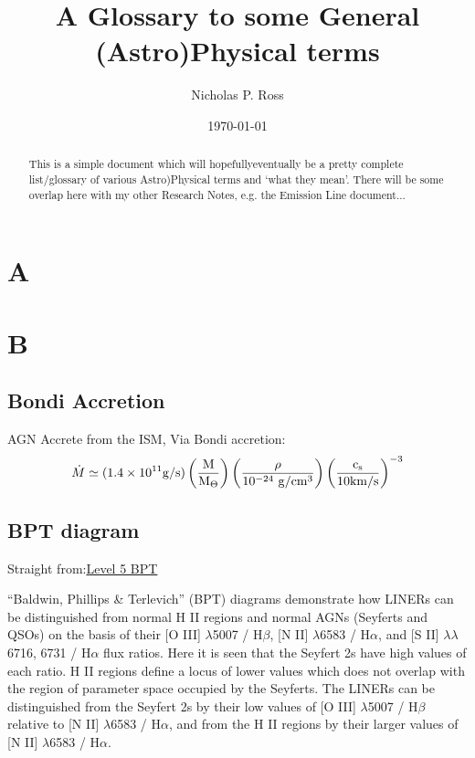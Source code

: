 \documentclass[11pt]{article}
\begin{document}
\title{A Glossary to some General (Astro)Physical terms}
\author{Nicholas P. Ross}
\date{\today}
\maketitle


\begin{abstract}
This is a simple document which will hopefully\/eventually be a pretty complete
list/glossary of various Astro)Physical terms and `what they mean'. There will 
be some overlap here with my other Research Notes, e.g. the Emission Line
document...
\end{abstract}

\section{A}
\section{B}
    \subsection{Bondi Accretion}
    AGN Accrete from the ISM, Via Bondi accretion:
    \begin{equation}
      \dot{M} \simeq (1.4\times10^{11} \rm{g/s}) \left( \frac{M}{M_{\Theta}} \right) \left( \frac{\rho}{10^{-24}\ \rm{g / cm^{3}}} \right)  \left( \frac{c_s}{10 \rm{km/s}} \right)^{-3}
    \end{equation}
    
    
    \subsection{BPT diagram}
    Straight from:\href{http://ned.ipac.caltech.edu/level5/Glossary/Essay_bpt.html}{Level 5 BPT}
    
    ``Baldwin, Phillips \& Terlevich'' (BPT) diagrams demonstrate how LINERs can be distinguished from normal H II regions and normal AGNs (Seyferts and QSOs) on the basis of their [O III] $\lambda$5007 / H$\beta$, [N II] $\lambda$6583 / H$\alpha$, and [S II] $\lambda \lambda$6716, 6731 / H$\alpha$ flux ratios. Here it is seen that the Seyfert 2s have high values of each ratio. H II regions define a locus of lower values which does not overlap with the region of parameter space occupied by the Seyferts. The LINERs can be distinguished from the Seyfert 2s by their low values of [O III] $\lambda$5007 / H$\beta$ relative to [N II] $\lambda$6583 / H$\alpha$, and from the H II regions by their larger values of [N II] $\lambda$6583 / H$\alpha$. 
\end{document}
